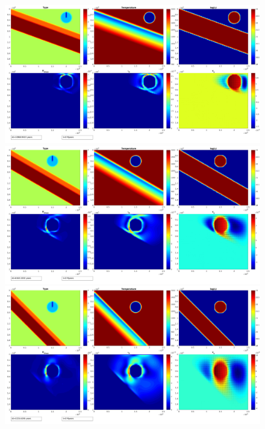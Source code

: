 \documentclass[12pt]{scrartcl}
\begin{document}
\begin{figure}
\begin{minipage}[c]{1.0\textwidth}
\begin{minipage}[t]{0.5\textwidth}
\includegraphics[width=1.0\textwidth]{./Snapshots/ref/Subductionzonewithblob1posrefslab20s2e7s2e7r20.jpg}
\end{minipage}
\begin{minipage}[t]{0.5\textwidth}
\includegraphics[width=1.0\textwidth]{./Snapshots/ref/Subductionzonewithblob1posrefslab30s2e7s2e7r20.jpg}
\end{minipage}
\end{minipage}
\begin{minipage}[c]{1.0\textwidth}
\begin{minipage}[t]{0.5\textwidth}
\includegraphics[width=1.0\textwidth]{./Snapshots/ref/Subductionzonewithblob1posrefslab45s2e7s2e7r20.jpg}

\end{minipage}
\end{minipage}
\end{figure}
\end{document}
